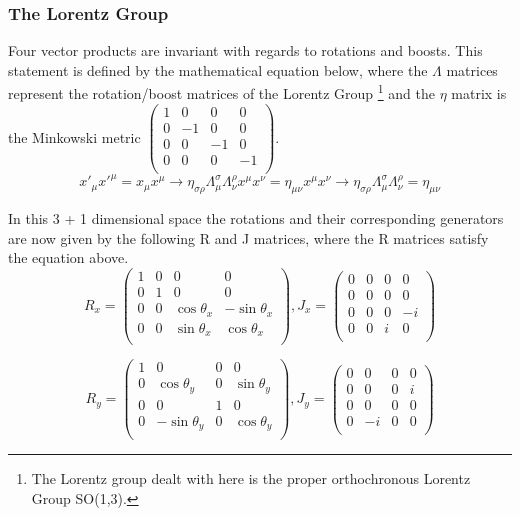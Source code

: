 \subsubsection{The Lorentz Group}
Four vector products are invariant with regards to rotations and boosts. This statement is defined by the mathematical equation below, where the $\Lambda$ matrices represent the rotation/boost matrices of the Lorentz Group \footnote{The Lorentz group dealt with here is the proper orthochronous Lorentz Group SO(1,3).} and the $\eta$ matrix is the Minkowski metric $\left( \begin{smallmatrix} 1 & 0 & 0 & 0 \\ 0 & -1 & 0 & 0 \\ 0 & 0 & -1 & 0 \\ 0 & 0 & 0 & -1 \\ \end{smallmatrix} \right)$.
\begin{equation}
x'_{\mu} x'^{\mu} = x_{\mu} x^{\mu} \rightarrow \eta_{\sigma\rho} \Lambda^{\sigma}_{\mu}  \Lambda^{\rho}_{\nu} x^{\mu} x^{\nu} = \eta_{\mu\nu} x^{\mu} x^{\nu}
\rightarrow \eta_{\sigma\rho} \Lambda^{\sigma}_{\mu}  \Lambda^{\rho}_{\nu} = \eta_{\mu\nu}
\end{equation}

In this 3 + 1 dimensional space the rotations and their corresponding generators are now given by the following R and J matrices, where the R matrices satisfy the equation above.
\begin{equation}
R_x = 
\begin{pmatrix}
1 & 0 & 0 & 0\\
0 & 1 & 0 & 0 \\
0 & 0 & \cos\theta_x & -\sin\theta_x \\
0 & 0 & \sin\theta_x & \cos\theta_x \\
\end{pmatrix},
J_x = 
\begin{pmatrix}
0 & 0 & 0 & 0\\
0 & 0 & 0 & 0 \\
0 & 0 & 0 & -i \\
0 & 0 & i & 0 \\
\end{pmatrix}
\end{equation}

\begin{equation}
R_y = 
\begin{pmatrix}
1 & 0 & 0 & 0\\
0 & \cos\theta_y & 0 & \sin\theta_y \\
0 & 0 & 1 & 0 \\
0 & -\sin\theta_y & 0 & \cos\theta_y \\
\end{pmatrix},
J_y = 
\begin{pmatrix}
0 & 0 & 0 & 0\\
0 & 0 & 0 & i \\
0 & 0 & 0 & 0 \\
0 & -i & 0 & 0 \\
\end{pmatrix}
\end{equation}

